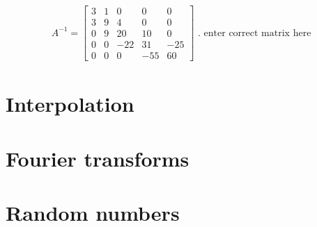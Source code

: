 \documentclass[paper=a4, fontsize=11pt]{scrartcl}
\begin{document}
\begin{align}
\label{A define}
A^{-1} = 
\begin{bmatrix}
3 & 1 & 0 & 0 & 0 \\
3 & 9 & 4 & 0 & 0 \\
0 & 9 & 20 & 10 & 0 \\
0 & 0 & -22 & 31 & -25 \\
0 & 0 & 0 & -55 & 60
\end{bmatrix} \text{ . enter correct matrix here}
\end{align}

\section{Interpolation}


\section{Fourier transforms}


\section{Random numbers}
\end{document}
